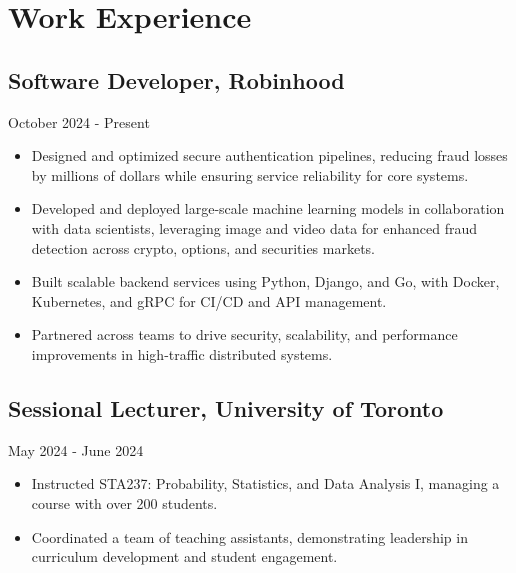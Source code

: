 \section{Work Experience}
\subsection{Software Developer, Robinhood}{October 2024 - Present}
\begin{itemize}[leftmargin=*]
\item Designed and optimized secure authentication pipelines, reducing fraud losses by millions of dollars while ensuring service reliability for core systems.
\item Developed and deployed large-scale machine learning models in collaboration with data scientists, leveraging image and video data for enhanced fraud detection across crypto, options, and securities markets.
\item Built scalable backend services using Python, Django, and Go, with Docker, Kubernetes, and gRPC for CI/CD and API management.
\item Partnered across teams to drive security, scalability, and performance improvements in high-traffic distributed systems.
\end{itemize}

\subsection{Sessional Lecturer, University of Toronto}{May 2024 - June 2024}
\begin{itemize}[leftmargin=*]
\item Instructed STA237: Probability, Statistics, and Data Analysis I, managing a course with over 200 students.
\item Coordinated a team of teaching assistants, demonstrating leadership in curriculum development and student engagement.
\end{itemize}


